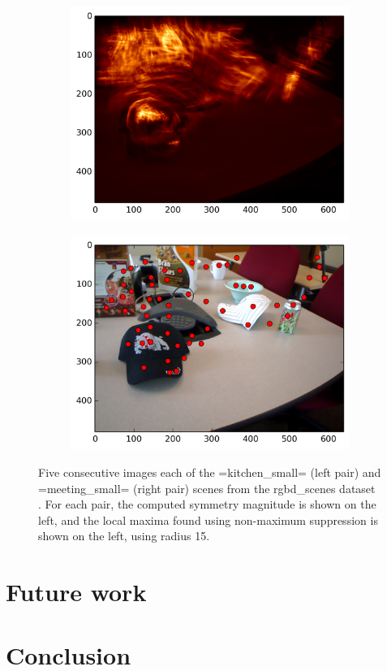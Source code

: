 \begin{figure}[ht]
\begin{subfigure}[]{0.2\linewidth}\label{fig:meet_smag_4}\includegraphics[width=0.2\linewidth]{figures/meeting_smag_9}\end{subfigure}
\begin{subfigure}[]{0.2\linewidth}\label{fig:meet_feats_4}\includegraphics[width=0.2\linewidth]{figures/meeting_feats_9}\end{subfigure}
\caption{Five consecutive images each of the =kitchen\_small= (left pair) and =meeting\_small= (right pair) scenes from the rgbd\_scenes dataset \cite{Henry2012}. For each pair, the computed symmetry magnitude is shown on the left, and the local maxima found using non-maximum suppression is shown on the left, using radius 15.}
\label{fig:ex_xforms}
\end{figure}

\section{Future work}
\label{sec:future}

\section{Conclusion}
\label{sec:conclusion}



